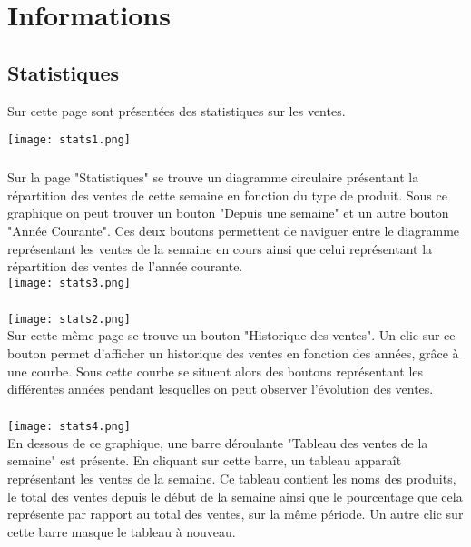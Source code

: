 \chapter{Informations}

\section{Statistiques}
Sur cette page sont présentées des statistiques sur les ventes.

\texttt{[image: stats1.png]}
\paragraph{}
Sur la page "Statistiques" se trouve un diagramme circulaire présentant la
répartition des ventes de cette semaine en fonction du type de produit. Sous
ce graphique on peut trouver un bouton "Depuis une semaine" et un autre bouton
"Année Courante". Ces deux boutons permettent de naviguer entre le diagramme
représentant les ventes de la semaine en cours ainsi que celui représentant la
répartition des ventes de l'année courante.\\

\texttt{[image: stats3.png]}

\paragraph{}
\texttt{[image: stats2.png]}\\
Sur cette même page se trouve un bouton "Historique des ventes". Un clic sur ce
bouton permet d'afficher un historique des ventes en fonction des années,
grâce à une courbe. Sous cette courbe se situent alors des boutons représentant
les différentes années pendant lesquelles on peut observer l'évolution des ventes.

\paragraph{}
\texttt{[image: stats4.png]}\\
En dessous de ce graphique, une barre déroulante "Tableau des ventes de la
semaine" est présente. En cliquant sur cette barre, un tableau apparaît
représentant les ventes de la semaine. Ce tableau contient les noms des
produits, le total des ventes depuis le début de la semaine ainsi que le
pourcentage que cela représente par rapport au total des ventes, sur la même
période. Un autre clic sur cette barre masque le tableau à nouveau.



